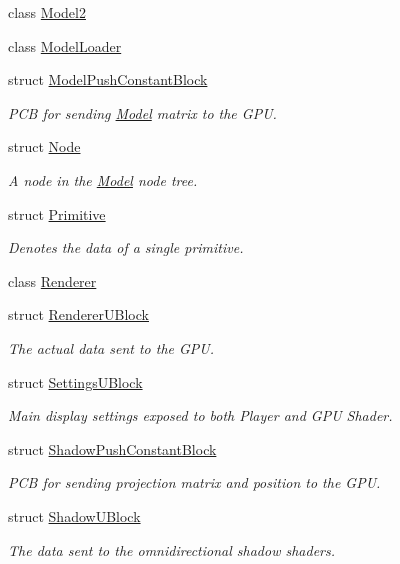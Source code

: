 \begin{DoxyCompactItemize}
class \hyperlink{classblaze_1_1Model2}{Model2}
\item 
class \hyperlink{classblaze_1_1ModelLoader}{Model\+Loader}
\item 
struct \hyperlink{structblaze_1_1ModelPushConstantBlock}{Model\+Push\+Constant\+Block}
\begin{DoxyCompactList}\small\item\em P\+CB for sending \hyperlink{classblaze_1_1Model}{Model} matrix to the G\+PU. \end{DoxyCompactList}\item 
struct \hyperlink{structblaze_1_1Node}{Node}
\begin{DoxyCompactList}\small\item\em A node in the \hyperlink{classblaze_1_1Model}{Model} node tree. \end{DoxyCompactList}\item 
struct \hyperlink{structblaze_1_1Primitive}{Primitive}
\begin{DoxyCompactList}\small\item\em Denotes the data of a single primitive. \end{DoxyCompactList}\item 
class \hyperlink{classblaze_1_1Renderer}{Renderer}
\item 
struct \hyperlink{structblaze_1_1RendererUBlock}{Renderer\+U\+Block}
\begin{DoxyCompactList}\small\item\em The actual data sent to the G\+PU. \end{DoxyCompactList}\item 
struct \hyperlink{structblaze_1_1SettingsUBlock}{Settings\+U\+Block}
\begin{DoxyCompactList}\small\item\em Main display settings exposed to both Player and G\+PU Shader. \end{DoxyCompactList}\item 
struct \hyperlink{structblaze_1_1ShadowPushConstantBlock}{Shadow\+Push\+Constant\+Block}
\begin{DoxyCompactList}\small\item\em P\+CB for sending projection matrix and position to the G\+PU. \end{DoxyCompactList}\item 
struct \hyperlink{structblaze_1_1ShadowUBlock}{Shadow\+U\+Block}
\begin{DoxyCompactList}\small\item\em The data sent to the omnidirectional shadow shaders. \end{DoxyCompactList}\item 

\end{DoxyCompactItemize}
